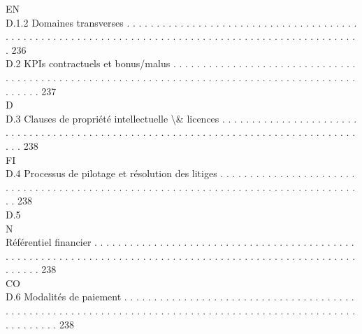 \documentclass[12pt,landscape,a4paper]{article}
\begin{document}
\vspace{0.5em}
\vspace{0.5em}
\vspace{0.5em}
\vspace{0.5em}
EN\\
D.1.2               Domaines transverses . . . . . . . . . . . . . . . . . . . . . . . . . . . . . . . . . . . . . . . . . . . . . . . . . . . . . . . . . . . . . . . . . . . . . . . . . . . . . . . . . . . . . . . . . . . . . . . . . . . 236\\
D.2     KPIs contractuels et bonus/malus . . . . . . . . . . . . . . . . . . . . . . . . . . . . . . . . . . . . . . . . . . . . . . . . . . . . . . . . . . . . . . . . . . . . . . . . . . . . . . . . . . . . . . . . . . . . . . . . 237\\
\vspace{0.5em}
\vspace{0.5em}
\vspace{0.5em}
\vspace{0.5em}
D\\
D.3     Clauses de propriété intellectuelle \textbackslash{}& licences . . . . . . . . . . . . . . . . . . . . . . . . . . . . . . . . . . . . . . . . . . . . . . . . . . . . . . . . . . . . . . . . . . . . . . . . . . . . . . . . . . . . . 238\\
\vspace{0.5em}
\vspace{0.5em}
\vspace{0.5em}
\vspace{0.5em}
FI\\
D.4     Processus de pilotage et résolution des litiges . . . . . . . . . . . . . . . . . . . . . . . . . . . . . . . . . . . . . . . . . . . . . . . . . . . . . . . . . . . . . . . . . . . . . . . . . . . . . . . . . . . . 238\\
D.5\\
N\\
Référentiel financier . . . . . . . . . . . . . . . . . . . . . . . . . . . . . . . . . . . . . . . . . . . . . . . . . . . . . . . . . . . . . . . . . . . . . . . . . . . . . . . . . . . . . . . . . . . . . . . . . . . . . . . . . . . . . 238\\
CO\\
D.6     Modalités de paiement . . . . . . . . . . . . . . . . . . . . . . . . . . . . . . . . . . . . . . . . . . . . . . . . . . . . . . . . . . . . . . . . . . . . . . . . . . . . . . . . . . . . . . . . . . . . . . . . . . . . . . . . . . . 238\\
\end{document}
